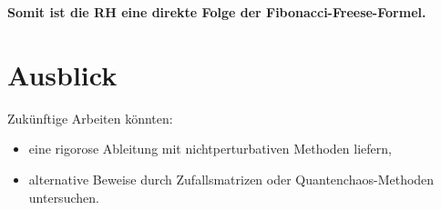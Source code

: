 \documentclass[a4paper,12pt]{article}
\begin{document}
\textbf{Somit ist die RH eine direkte Folge der Fibonacci-Freese-Formel.}

\section{Ausblick}
Zukünftige Arbeiten könnten:
\begin{itemize}
    \item eine rigorose Ableitung mit nichtperturbativen Methoden liefern,
    \item alternative Beweise durch Zufallsmatrizen oder Quantenchaos-Methoden untersuchen.
\end{itemize}
\end{document}
